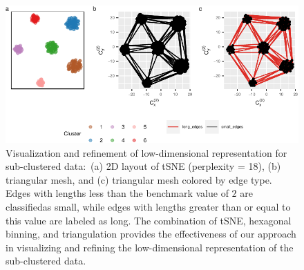 \documentclass[
  12pt]{article}
\begin{document}
\begin{figure}

{\centering \includegraphics[width=1\textwidth,height=\textheight]{paper_files/figure-pdf/fig-example3-1.pdf}

}

\caption{\label{fig-example3}Visualization and refinement of
low-dimensional representation for sub-clustered data\(\colon\) (a) 2D
layout of tSNE (perplexity = 18), (b) triangular mesh, and (c)
triangular mesh colored by edge type. Edges with lengths less than the
benchmark value of \(2\) are classifiedas small, while edges with
lengths greater than or equal to this value are labeled as long. The
combination of tSNE, hexagonal binning, and triangulation provides the
effectiveness of our approach in visualizing and refining the
low-dimensional representation of the sub-clustered data.}

\end{figure}
\end{document}
